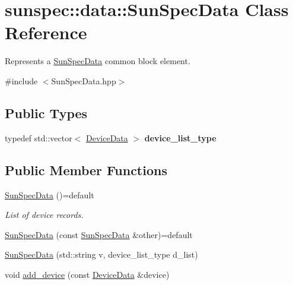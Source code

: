 \hypertarget{structsunspec_1_1data_1_1_sun_spec_data}{}\section{sunspec\+:\+:data\+:\+:Sun\+Spec\+Data Class Reference}
\label{structsunspec_1_1data_1_1_sun_spec_data}


Represents a \hyperlink{structsunspec_1_1data_1_1_sun_spec_data}{Sun\+Spec\+Data} common block element.  




{\ttfamily \#include $<$Sun\+Spec\+Data.\+hpp$>$}

\subsection*{Public Types}
\begin{DoxyCompactItemize}
\item 
\mbox{\label{structsunspec_1_1data_1_1_sun_spec_data_a104b19b0bddeb33e5937e937e9e0b72d}} 
typedef std\+::vector$<$ \hyperlink{structsunspec_1_1data_1_1_device_data}{Device\+Data} $>$ {\bfseries device\+\_\+list\+\_\+type}
\end{DoxyCompactItemize}
\subsection*{Public Member Functions}
\begin{DoxyCompactItemize}
\item 
\hyperlink{structsunspec_1_1data_1_1_sun_spec_data_a8ad742efc8d2f0b8eab04505e9849084}{Sun\+Spec\+Data} ()=default
\begin{DoxyCompactList}\small\item\em List of device records. \end{DoxyCompactList}\item 
\hyperlink{structsunspec_1_1data_1_1_sun_spec_data_a712ee0978e396de352b28e5f6df7b681}{Sun\+Spec\+Data} (const \hyperlink{structsunspec_1_1data_1_1_sun_spec_data}{Sun\+Spec\+Data} \&other)=default
\item 
\hyperlink{structsunspec_1_1data_1_1_sun_spec_data_a3e13d41d1dc8f1fc09a5eb80bb602795}{Sun\+Spec\+Data} (std\+::string v, device\+\_\+list\+\_\+type d\+\_\+list)
\item 
void \hyperlink{structsunspec_1_1data_1_1_sun_spec_data_a9747c26b6951423f1cd1a17c39bd0878}{add\+\_\+device} (const \hyperlink{structsunspec_1_1data_1_1_device_data}{Device\+Data} \&device)
\end{DoxyCompactItemize}
